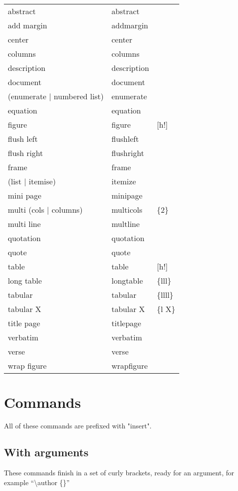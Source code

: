 \documentclass[12pt, a4paper]{article}
\begin{document}
\begin{longtable}{lll}
abstract & abstract & \\
add margin & addmargin & \\
center & center & \\
columns & columns & \\
description & description & \\
document & document & \\
(enumerate | numbered list) & enumerate & \\
equation & equation & \\
figure & figure & [h!] \\
flush left & flushleft & \\
flush right & flushright & \\
frame & frame & \\
(list | itemise) & itemize & \\
mini page & minipage & \\
multi (cols | columns) & multicols & \{2\} \\
multi line & multline & \\
quotation & quotation & \\
quote & quote & \\
table & table & [h!] \\
long table & longtable & \{lll\} \\
tabular & tabular & \{llll\} \\
tabular X & tabular X & \{l X\} \\
title page & titlepage & \\
verbatim & verbatim & \\
verse & verse & \\
wrap figure & wrapfigure & \\
\end{longtable}

\section{Commands}
All of these commands are prefixed with "insert".

\subsection{With arguments}
These commands finish in a set of curly brackets, ready for an argument, for example ``\textbackslash author \{\}''
\end{document}
